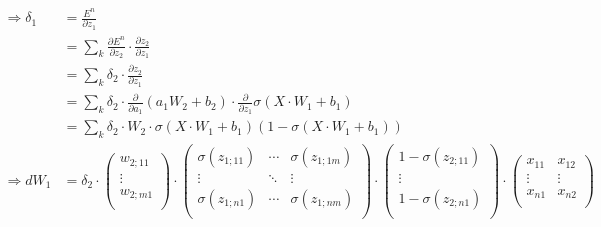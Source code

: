 \begin{align*}    
    \Rightarrow \delta_{1} &= \frac{E^{n}}{\partial z_{1}}\\
    &= \sum_{k} \frac{\partial E^{n}}{\partial z_{2}}\cdot \frac{\partial z_{2}}{\partial z_{1}}\\
    &= \sum_{k} \delta_{2} \cdot \frac{\partial z_{2}}{\partial z_{1}}\\
    &= \sum_{k} \delta_{2}\cdot \frac{\partial }{\partial a_{1}}(a_{1}W_{2}+b_{2})\cdot \frac{\partial }{\partial z_{1}}\sigma(X\cdot W_{1} +b_{1})\\
    &= \sum_{k} \delta_{2}\cdot W_{2} \cdot \sigma(X\cdot W_{1}+b_{1})(1- \sigma(X\cdot W_{1}+b_{1}))\\
    \Rightarrow dW_{1}&= \delta_{2} \cdot \begin{pmatrix}
                        w_{2;11} \\
                        \vdots \\
                        w_{2;m1} \\
                        \end{pmatrix} \cdot \begin{pmatrix}
                                            \sigma (z_{1;11})& \cdots & \sigma(z_{1;1m}) \\
                                            \vdots & \ddots &\vdots\\
                                            \sigma (z_{1;n1}) & \cdots & \sigma (z_{1;nm})  \\
                                            \end{pmatrix} \cdot \begin{pmatrix}
                                                                1-\sigma (z_{2;11}) \\
                                                                \vdots \\
                                                                1-\sigma (z_{2;n1})  \\
                                                                \end{pmatrix} \cdot \begin{pmatrix}
                                                                                         x_{11} & x_{12}\\
                                                                                         \vdots & \vdots\\
                                                                                         x_{n1} & x_{n2}\\

\end{pmatrix}
\end{align*}
